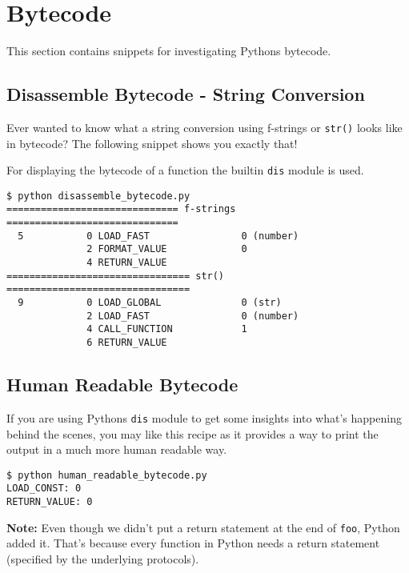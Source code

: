 
\section{Bytecode}

This section contains snippets for investigating Pythons bytecode.


\subsection{Disassemble Bytecode - String Conversion}

Ever wanted to know what a string conversion using f-strings or \lstinline{str()} looks like in bytecode?
The following snippet shows you exactly that!



For displaying the bytecode of a function the builtin \lstinline{dis} module is used.

\begin{lstlisting}[caption=Output of disassemble\_bytecode.py]
$ python disassemble_bytecode.py
============================== f-strings ==============================
  5           0 LOAD_FAST                0 (number)
              2 FORMAT_VALUE             0
              4 RETURN_VALUE
================================ str() ================================
  9           0 LOAD_GLOBAL              0 (str)
              2 LOAD_FAST                0 (number)
              4 CALL_FUNCTION            1
              6 RETURN_VALUE
\end{lstlisting}


\subsection{Human Readable Bytecode}

If you are using Pythons \lstinline{dis} module to get some insights into what's happening behind the scenes, you may like this recipe as it provides a way to print the output in a much more human readable way.



\begin{lstlisting}[caption=Output of human\_readable\_bytecode.py]
$ python human_readable_bytecode.py
LOAD_CONST: 0
RETURN_VALUE: 0
\end{lstlisting}

\textbf{Note:} Even though we didn't put a return statement at the end of \lstinline{foo}, Python added it.
That's because every function in Python needs a return statement (specified by the underlying protocols).
